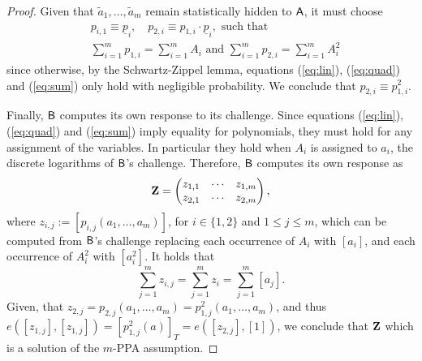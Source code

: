 \begin{proof}
Given that $\tilde{a}_{1},\ldots,\tilde{a}_{m}$ remain statistically hidden to $\mathsf{A}$, it must choose
\begin{align*}
&p_{i,1}\equiv \underline{p}_i, \quad p_{2,i}\equiv p_{1,i}\cdot \underline{p}_i,\text{ such that }\\
&\sum_{i=1}^m p_{1,i} = \sum_{i=1}^m A_{i} \text{ and } \sum_{i=1}^m p_{2,i} = \sum_{i=1}^m A_{i}^2
\end{align*}
since otherwise, by the Schwartz-Zippel lemma, equations (\ref{eq:lin}), (\ref{eq:quad}) and (\ref{eq:sum}) only hold with negligible probability. We conclude that $p_{2,i}\equiv p^2_{1,i}$.

Finally, $\mathsf{B}$ computes its own response to its challenge. Since equations (\ref{eq:lin}), (\ref{eq:quad}) and (\ref{eq:sum}) imply equality for polynomials, they must hold for any assignment of the variables. In particular they hold when $A_{i}$ is assigned to $a_{i}$, the discrete logarithms of $\mathsf{B}$'s challenge. Therefore, $\mathsf{B}$ computes its own response as
$$
\mathbf{{Z}} = \begin{pmatrix}
	z_{1,1}&\cdots&z_{1,m}\\z_{2,1}&\cdots&z_{2,m}
\end{pmatrix},
$$
where $z_{i,j} := [p_{i,j}(a_{1},\ldots,a_m)]$, for $i\in\{1,2\}$ and $1\leq j \leq m$, which can be computed from $\mathsf{B}$'s challenge replacing each occurrence of $A_i$ with $[a_i]$, and each occurrence of $A_i^2$ with  $[a_i^2]$. It holds that
$$
\sum_{j=1}^m z_{i,j} = \sum_{j=1}^m z_i  = \sum_{j=1}^m [a_j].
$$
Given, that $z_{2,j} = p_{2,j}(a_1,\ldots,a_m) = p_{1,j}^2(a_1,\ldots,a_m)$, and thus $e([z_{1,j}],[z_{1,j}]) = [p_{1,j}^2(a)]_T = e([z_{2,j}],[1])$, we conclude that  $\mathbf{{Z}}$ which is a solution of the $m$-PPA assumption.
\end{proof}

